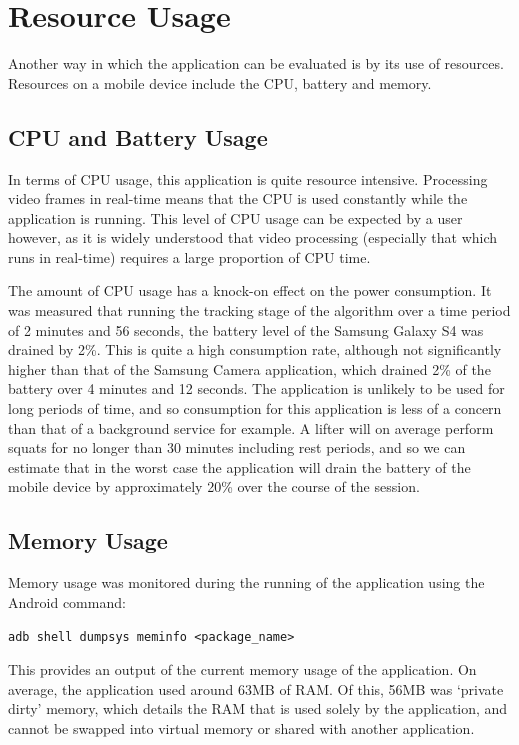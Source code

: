 \section{Resource Usage}

Another way in which the application can be evaluated is by its use of resources. Resources on a mobile device include the CPU, battery and memory.

\subsection{CPU and Battery Usage}
In terms of CPU usage, this application is quite resource intensive. Processing video frames in real-time means that the CPU is used constantly while the application is running. This level of CPU usage can be expected by a user however, as it is widely understood that video processing (especially that which runs in real-time) requires a large proportion of CPU time.

The amount of CPU usage has a knock-on effect on the power consumption. It was measured that running the tracking stage of the algorithm over a time period of 2 minutes and 56 seconds, the battery level of the Samsung Galaxy S4 was drained by 2\%. This is quite a high consumption rate, although not significantly higher than that of the Samsung Camera application, which drained 2\% of the battery over 4 minutes and 12 seconds. The application is unlikely to be used for long periods of time, and so consumption for this application is less of a concern than that of a background service for example. A lifter will on average perform squats for no longer than 30 minutes including rest periods, and so we can estimate that in the worst case the application will drain the battery of the mobile device by approximately 20\% over the course of the session.

\subsection{Memory Usage}
Memory usage was monitored during the running of the application using the Android command:

\texttt{adb shell dumpsys meminfo <package\_name>}

This provides an output of the current memory usage of the application. On average, the application used around 63MB of RAM. Of this, 56MB was `private dirty' memory, which details the RAM that is used solely by the application, and cannot be swapped into virtual memory or shared with another application.

